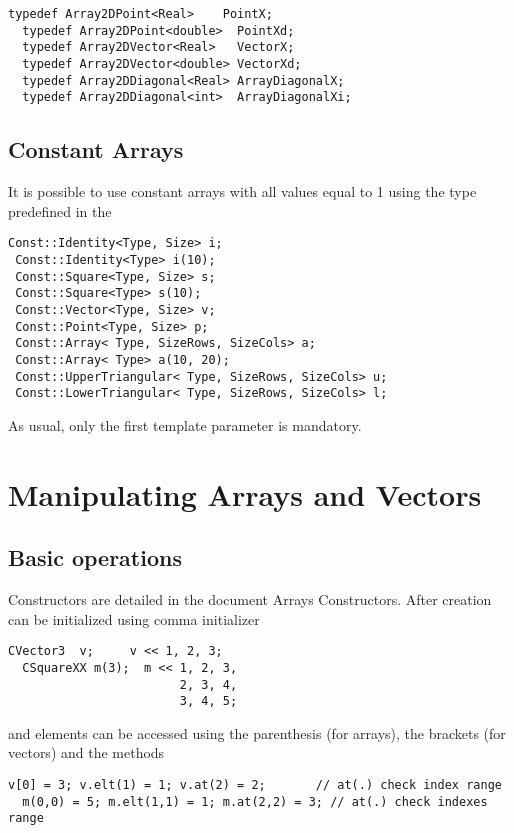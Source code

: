 \documentclass[a4paper,10pt]{article}
\begin{document}
\begin{lstlisting}[style=customcpp,caption=Array2DVector\, Array2DPoint and Array2DDiagonal]
  typedef Array2DPoint<Real>    PointX;
  typedef Array2DPoint<double>  PointXd;
  typedef Array2DVector<Real>   VectorX;
  typedef Array2DVector<double> VectorXd;
  typedef Array2DDiagonal<Real> ArrayDiagonalX;
  typedef Array2DDiagonal<int>  ArrayDiagonalXi;
\end{lstlisting}

\subsection{Constant Arrays}
It is possible to use constant arrays with all values equal to 1 using
the type predefined in the 
\begin{lstlisting}[style=customcpp]
 Const::Identity<Type, Size> i;
 Const::Identity<Type> i(10);
 Const::Square<Type, Size> s;
 Const::Square<Type> s(10);
 Const::Vector<Type, Size> v;
 Const::Point<Type, Size> p;
 Const::Array< Type, SizeRows, SizeCols> a;
 Const::Array< Type> a(10, 20);
 Const::UpperTriangular< Type, SizeRows, SizeCols> u;
 Const::LowerTriangular< Type, SizeRows, SizeCols> l;
\end{lstlisting}
As usual, only the first template parameter is mandatory.

\section{Manipulating Arrays and Vectors}

\subsection{Basic operations}
Constructors are detailed in the document Arrays Constructors.
After creation  can be initialized using comma initializer
\begin{lstlisting}[style=customcpp]
  CVector3  v;     v << 1, 2, 3;
  CSquareXX m(3);  m << 1, 2, 3,
                        2, 3, 4,
                        3, 4, 5;
\end{lstlisting}
and elements can be accessed using the parenthesis (for arrays), the brackets
(for vectors) and the  methods
\begin{lstlisting}[style=customcpp]
  v[0] = 3; v.elt(1) = 1; v.at(2) = 2;       // at(.) check index range
  m(0,0) = 5; m.elt(1,1) = 1; m.at(2,2) = 3; // at(.) check indexes range
\end{lstlisting}
\end{document}

